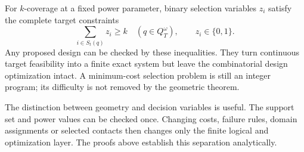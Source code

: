 For $k$-coverage at a fixed power parameter, binary selection variables $z_i$ satisfy the complete target constraints
\begin{equation}\label{eq:selection-constraints}
\sum_{i\in S_t(q)}z_i\ge k\quad(q\in Q_T^\omega),\qquad z_i\in\{0,1\}.
\end{equation}
Any proposed design can be checked by these inequalities. They turn continuous target feasibility into a finite exact system but leave the combinatorial design optimization intact. A minimum-cost selection problem is still an integer program; its difficulty is not removed by the geometric theorem.

The distinction between geometry and decision variables is useful. The support set and power values can be checked once. Changing costs, failure rules, domain assignments or selected contacts then changes only the finite logical and optimization layer. The proofs above establish this separation analytically.
